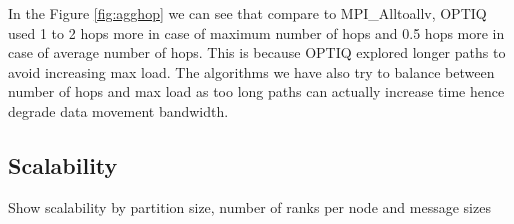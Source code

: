 In the Figure \ref{fig:agghop} we can see that compare to MPI\_Alltoallv, OPTIQ used 1 to 2 hops more in case of maximum number of hops and 0.5 hops more in case of average number of hops. This is because OPTIQ explored longer paths to avoid increasing max load. The algorithms we have also try to balance between number of hops and max load as too long paths can actually increase time hence degrade data movement bandwidth.

\subsection{Scalability}
Show scalability by partition size, number of ranks per node and message sizes
